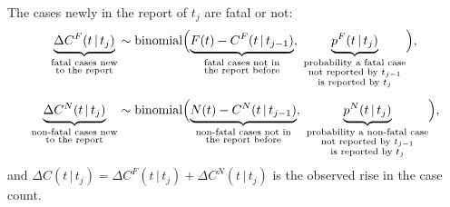 \documentclass[11pt,a4paper]{article}
\newcommand{\given}{\,|\,}
\newcommand{\bin}{\operatorname{binomial}}
\begin{document}
The cases newly in the report of $t_j$ are fatal or not:
\begin{align}
\underbrace{\Delta C^{F}(t\given t_j)}_{\substack{\text{fatal cases new}\\ \text{to the report}}}
 &\sim\bin\Bigl(
 \underbrace{F(t)-C^{F}(t\given t_{j-1})}_{\substack{\text{fatal cases not in}\\ \text{the report before}}},\
 \underbrace{p^{F}(t\given t_j)}_{\substack{\text{probability a fatal case}\\ \text{not reported by } t_{j-1}\\ \text{is reported by } t_j}}
 \Bigr),
 \label{eq:a}\\[1ex]
\underbrace{\Delta C^{N}(t\given t_j)}_{\substack{\text{non-fatal cases new}\\ \text{to the report}}}
 &\sim\bin\Bigl(
 \underbrace{N(t)-C^{N}(t\given t_{j-1})}_{\substack{\text{non-fatal cases not in}\\ \text{the report before}}},\
 \underbrace{p^{N}(t\given t_j)}_{\substack{\text{probability a non-fatal case}\\ \text{not reported by } t_{j-1}\\ \text{is reported by } t_j}}
 \Bigr),
 \label{eq:b}
\end{align}
and $\Delta C(t\given t_j)=\Delta C^{F}(t\given t_j)+\Delta C^{N}(t\given t_j)$ is
the observed rise in the case count.
\end{document}
